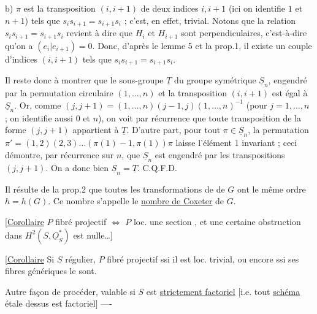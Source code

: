 b) $\pi$ est la transposition $(i,i+1)$ de deux indices $i,i+1$ (ici on identifie $1$ et $n+1$) tels que $s_is_{i+1}=s_{i+1}s_i$ ; c'est, en effet, trivial. Notons que la relation $s_is_{i+1}=s_{i+1}s_i$ revient à dire que $H_i$ et $H_{i+1}$ sont perpendiculaires, c'est-à-dire qu'on a $(e_i|e_{i+1})=0$. Donc, d'après le lemme 5 et la prop.1, il existe un couple d'indices $(i,i+1)$ tels que $s_is_{i+1}=s_{i+1}s_i$.

Il reste donc à montrer que le sous-groupe $\underline{T}$ du groupe symétrique $\underline{S}_n$, engendré par la permutation circulaire $(1,\ldots,n)$ et la transposition $(i,i+1)$ est égal à $\underline{S}_n$. Or, comme $(j,j+1)=(1,\ldots,n)(j-1,j)(1,\ldots,n)^{-1}$ (pour $j=1,\ldots,n$ ; on identifie aussi $0$ et $n$), on voit par récurrence que toute transposition de la forme $(j,j+1)$ appartient à $\underline{T}$. D'autre part, pour tout $\pi\in\underline{S}_n$, la permutation $\pi'=(1,2)(2,3)\ldots(\pi(1)-1,\pi(1))\pi$ laisse l'élément $1$ invariant ; ceci démontre, par récurrence sur $n$, que $\underline{S}_n$ est engendré par les transpositions $(j,j+1)$. On a donc bien $\underline{S}_n=\underline{T}$. C.Q.F.D.

Il résulte de la prop.2 que toutes les transformations de  de $G$ ont le même ordre $h=h(G)$. Ce nombre s'appelle le \uline{nombre de Coxeter} de $G$.


[\uline{Corollaire} $P$ fibré projectif $\Longleftrightarrow$ $P$  loc. une section , et une certaine obstruction dans $H^2(S,\underline{O}_S^*)$ est nulle\ldots]

[\uline{Corollaire} Si $S$ régulier, $P$ fibré projectif ssi il est loc. trivial, ou encore ssi ses fibres génériques le sont.

Autre façon de procéder, valable si $S$ est \uline{strictement  factoriel} [i.e. tout \uline{schéma} étale dessus est  factoriel] ----

